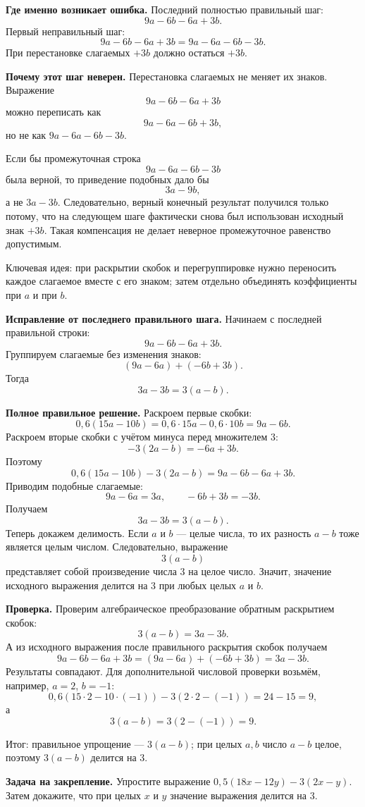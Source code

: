 \documentclass[12pt,a4paper]{article}
\begin{document}
\textbf{Где именно возникает ошибка.}
Последний полностью правильный шаг:
\[
9a-6b-6a+3b.
\]
Первый неправильный шаг:
\[
9a-6b-6a+3b=9a-6a-6b-3b.
\]
При перестановке слагаемых $+3b$ должно остаться $+3b$.

\textbf{Почему этот шаг неверен.}
Перестановка слагаемых не меняет их знаков. Выражение
\[
9a-6b-6a+3b
\]
можно переписать как
\[
9a-6a-6b+3b,
\]
но не как $9a-6a-6b-3b$.

Если бы промежуточная строка
\[
9a-6a-6b-3b
\]
была верной, то приведение подобных дало бы
\[
3a-9b,
\]
а не $3a-3b$.
Следовательно, верный конечный результат получился только потому, что на следующем шаге фактически снова был использован исходный знак $+3b$. Такая компенсация не делает неверное промежуточное равенство допустимым.

\textcolor{blue!60!black}{Ключевая идея:} при раскрытии скобок и перегруппировке нужно переносить каждое слагаемое вместе с его знаком; затем отдельно объединять коэффициенты при $a$ и при $b$.

\textbf{Исправление от последнего правильного шага.}
Начинаем с последней правильной строки:
\[
9a-6b-6a+3b.
\]
Группируем слагаемые без изменения знаков:
\[
(9a-6a)+(-6b+3b).
\]
Тогда
\[
3a-3b=3(a-b).
\]

\textbf{Полное правильное решение.}
Раскроем первые скобки:
\[
0{,}6(15a-10b)=0{,}6\cdot15a-0{,}6\cdot10b=9a-6b.
\]
Раскроем вторые скобки с учётом минуса перед множителем $3$:
\[
-3(2a-b)=-6a+3b.
\]
Поэтому
\[
0{,}6(15a-10b)-3(2a-b)=9a-6b-6a+3b.
\]
Приводим подобные слагаемые:
\[
9a-6a=3a,
\qquad
-6b+3b=-3b.
\]
Получаем
\[
3a-3b=3(a-b).
\]
Теперь докажем делимость. Если $a$ и $b$ --- целые числа, то их разность $a-b$ тоже является целым числом. Следовательно, выражение
\[
3(a-b)
\]
представляет собой произведение числа $3$ на целое число. Значит, значение исходного выражения делится на $3$ при любых целых $a$ и $b$.

\textbf{Проверка.}
Проверим алгебраическое преобразование обратным раскрытием скобок:
\[
3(a-b)=3a-3b.
\]
А из исходного выражения после правильного раскрытия скобок получаем
\[
9a-6b-6a+3b=(9a-6a)+(-6b+3b)=3a-3b.
\]
Результаты совпадают.
Для дополнительной числовой проверки возьмём, например, $a=2$, $b=-1$:
\[
0{,}6(15\cdot2-10\cdot(-1))-3(2\cdot2-(-1))=24-15=9,
\]
а
\[
3(a-b)=3(2-(-1))=9.
\]

\textcolor{teal!60!black}{Итог:} правильное упрощение --- $3(a-b)$; при целых $a,b$ число $a-b$ целое, поэтому $3(a-b)$ делится на $3$.

\textbf{Задача на закрепление.}
Упростите выражение $0{,}5(18x-12y)-3(2x-y)$. Затем докажите, что при целых $x$ и $y$ значение выражения делится на $3$.
\end{document}
